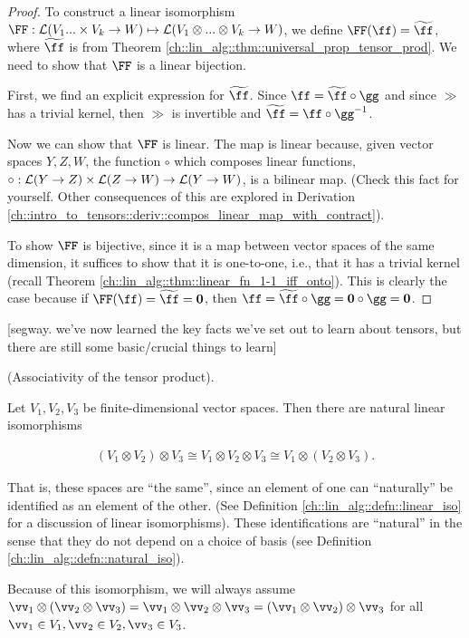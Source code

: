 \begin{proof}
    To construct a linear isomorphism $\FF:\LLLL(V_1 ... \times V_k \rightarrow W) \mapsto \LLLL(V_1 \otimes ... \otimes V_k \rightarrow W)$, we define $\FF(\ff) = \widetilde{\ff}$, where $\widetilde{\ff}$ is from Theorem \ref{ch::lin_alg::thm::universal_prop_tensor_prod}. We need to show that $\FF$ is a linear bijection. 
    
    First, we find an explicit expression for $\widetilde{\ff}$. Since $\ff = \widetilde{\ff} \circ \gg$ and since $\gg$ has a trivial kernel, then $\gg$ is invertible and $\widetilde{\ff} = \ff \circ \gg^{-1}$.

    Now we can show that $\FF$ is linear. The map is linear because, given vector spaces $Y, Z, W$, the function $\circ$ which composes linear functions, ${\circ:\mathcal{L}(Y \rightarrow Z) \times \mathcal{L}(Z \rightarrow W) \rightarrow \mathcal{L}(Y \rightarrow W)}$, is a bilinear map. (Check this fact for yourself. Other consequences of this are explored in Derivation \ref{ch::intro_to_tensors::deriv::compos_linear_map_with_contract}). 
    
    To show $\FF$ is bijective, since it is a map between vector spaces of the same dimension, it suffices to show that it is one-to-one, i.e., that it has a trivial kernel (recall Theorem \ref{ch::lin_alg::thm::linear_fn_1-1_iff_onto}). This is clearly the case because if $\FF(\ff) = \widetilde{\ff} = \mathbf{0}$, then $\ff = \widetilde{\ff} \circ \gg = \mathbf{0} \circ \gg = \mathbf{0}$.
\end{proof}

[segway. we've now learned the key facts we've set out to learn about tensors, but there are still some basic/crucial things to learn]

\begin{theorem}    \label{ch::motivated_intro::thm::tensor_product_associative}
    (Associativity of the tensor product). 
    
    Let $V_1, V_2, V_3$ be finite-dimensional vector spaces. Then there are natural linear isomorphisms
    
    \begin{align*}
        (V_1 \otimes V_2) \otimes V_3 \cong V_1 \otimes V_2 \otimes V_3 \cong V_1 \otimes (V_2 \otimes V_3).
    \end{align*}
    
    That is, these spaces are ``the same'', since an element of one can ``naturally'' be identified as an element of the other. (See Definition \ref{ch::lin_alg::defn::linear_iso} for a discussion of linear isomorphisms). These identifications are ``natural'' in the sense that they do not depend on a choice of basis (see Definition \ref{ch::lin_alg::defn::natural_iso}).

    Because of this isomorphism, we will always assume $\vv_1 \otimes (\vv_2 \otimes \vv_3) = \vv_1 \otimes \vv_2 \otimes \vv_3 = (\vv_1 \otimes \vv_2) \otimes \vv_3$ for all $\vv_1 \in V_1, \vv_2 \in V_2, \vv_3 \in V_3$.
\end{theorem}

